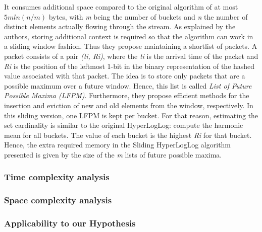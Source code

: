 It consumes additional space compared to the original algorithm of at most $5\textit{m}ln(\textit{n}/\textit{m})$ bytes, with \textit{m} being the number of buckets and \textit{n} the number of distinct elements actually flowing through the stream. As explained by the authors, storing additional context is required so that the algorithm can work in a sliding window fashion. Thus they propose maintaining a shortlist of packets. A packet consists of a pair \textit{(ti, Ri)}, where the \textit{ti} is the arrival time of the packet and \textit{Ri} is the position of the leftmost 1-bit in the binary representation of the hashed value associated with that packet. The idea is to store only packets that are a possible maximum over a future window. Hence, this list is called \textit{List of Future Possible Maxima (LFPM)}. Furthermore, they propose efficient methods for the insertion and eviction of new and old elements from the window, respectively. In this sliding version, one LFPM is kept per bucket. For that reason, estimating the set cardinality is similar to the original HyperLogLog: compute the harmonic mean for all buckets. The value of each bucket is the highest \textit{Ri} for that bucket. Hence, the extra required memory in the Sliding HyperLogLog algorithm presented is given by the size of the \textit{m} lists of future possible maxima.

\subsubsection{Time complexity analysis}

\subsubsection{Space complexity analysis}

\subsubsection{Applicability to our Hypothesis}

\fi

 